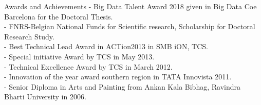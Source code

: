 \documentclass{resume} %
\begin{document}
\begin{rSection}{Awards and Achievements}
- Big Data Talent Award 2018 given in Big Data  Coe Barcelona for the Doctoral Thesis.\\
- FNRS-Belgian National Funds for Scientific research, Scholarship for Doctoral Research Study.\\
- Best Technical Lead Award in ACTion2013 in SMB iON, TCS. \\
- Special initiative Award by TCS in May 2013.\\
- Technical Excellence Award by TCS in March 2012.\\
- Innovation of the year award southern region in TATA Innovista 2011.\\
- Senior Diploma in Arts and Painting from Ankan Kala Bibhag, Ravindra Bharti University in 2006.\\
\end{rSection}
\end{document}
